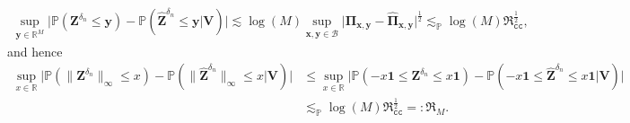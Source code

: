 \documentclass[10pt]{article}
\renewcommand{\P}{\mathbb{P}}
\newcommand{\reals}{\mathbb{R}}
\newcommand{\infnorm}[1]{\lVert #1 \rVert_{\infty}}
\newcommand{\lessp}{\lesssim_{\mathbb{P}}}
\newcommand{\bV}{\mathbf{V}}
\newcommand{\bx}{\mathbf{x}}
\newcommand{\by}{\mathbf{y}}
\newcommand{\bZ}{\mathbf{Z}}
\newcommand{\bPi}{\boldsymbol{\Pi}}
\newcommand{\B}{\mathcal{B}}
\begin{document}
\begin{align*}
    \sup_{\by \in \reals^{M}} \big|\P(\bZ^{\delta_n}\leq \by) - \P(\widehat{\bZ}^{\delta_n} \leq \by | \bV) \big|
    \lesssim \log(M) \sup_{\bx,\by \in \B} \big|\bPi_{\bx, \by} - \widehat{\bPi}_{\bx,\by}\big|^{\frac{1}{2}}
    \lessp \log(M) \mathfrak{R}_{\mathtt{cc}}^{\frac{1}{2}},
\end{align*}
and hence
\begin{align*}
    \sup_{x \in \reals} \big|\P(\infnorm{\bZ^{\delta_n}} \leq x ) - \P(\infnorm{\widehat{\bZ}^{\delta_n}} \leq x | \bV)\big|
    &\leq \sup_{x \in \reals} \big|\P(- x\mathbf{1} \leq \bZ^{\delta_n} \leq x \mathbf{1}) - \P(- x\mathbf{1} \leq \widehat{\bZ}^{\delta_n}  \leq x \mathbf{1} | \bV)\big| \\
    & \lessp  \log(M) \mathfrak{R}_{\mathtt{cc}}^{\frac{1}{2}} =: \mathfrak{R}_M.
\end{align*}
\end{document}
